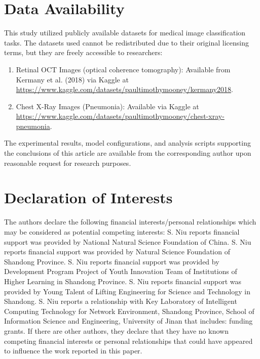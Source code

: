\documentclass[preprint,12pt]{elsarticle}
\begin{document}
\section*{Data Availability}
This study utilized publicly available datasets for medical image classification tasks. The datasets used cannot be redistributed due to their original licensing terms, but they are freely accessible to researchers:
\begin{enumerate}
\item Retinal OCT Images (optical coherence tomography): Available from Kermany et al. (2018) via Kaggle at \\
\url{https://www.kaggle.com/datasets/paultimothymooney/kermany2018}.
\item Chest X-Ray Images (Pneumonia): Available via Kaggle at \\
\url{https://www.kaggle.com/datasets/paultimothymooney/chest-xray-pneumonia}.
\end{enumerate}
The experimental results, model configurations, and analysis scripts supporting the conclusions of this article are available from the corresponding author upon reasonable request for research purposes.

\section*{Declaration of Interests}
The authors declare the following financial interests/personal relationships which may be considered as potential competing interests: S. Niu reports financial support was provided by National Natural Science Foundation of China. S. Niu reports financial support was provided by Natural Science Foundation of Shandong Province. S. Niu reports financial support was provided by Development Program Project of Youth Innovation Team of Institutions of Higher Learning in Shandong Province. S. Niu reports financial support was provided by Young Talent of Lifting Engineering for Science and Technology in Shandong. S. Niu reports a relationship with Key Laboratory of Intelligent Computing Technology for Network Environment, Shandong Province, School of Information Science and Engineering, University of Jinan that includes: funding grants. If there are other authors, they declare that they have no known competing financial interests or personal relationships that could have appeared to influence the work reported in this paper.


 


\end{document}

